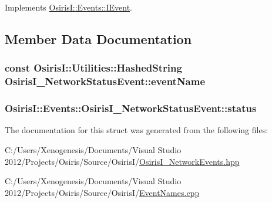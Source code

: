 Implements \hyperlink{struct_osiris_i_1_1_events_1_1_i_event_afb77e9812899e26563a5ee131c4c5d29}{Osiris\-I\-::\-Events\-::\-I\-Event}.



\subsection{Member Data Documentation}
\hypertarget{struct_osiris_i_1_1_events_1_1_osiris_i___network_status_event_a18ac0b938dfa57851e24080173a109fa}{
\subsubsection[{event\-Name}]{\setlength{\rightskip}{0pt plus 5cm}const {\bf Osiris\-I\-::\-Utilities\-::\-Hashed\-String} Osiris\-I\-\_\-\-Network\-Status\-Event\-::event\-Name\hspace{0.3cm}{\ttfamily [static]}}}\label{struct_osiris_i_1_1_events_1_1_osiris_i___network_status_event_a18ac0b938dfa57851e24080173a109fa}
\hypertarget{struct_osiris_i_1_1_events_1_1_osiris_i___network_status_event_a37129c546f0b1f7771ee633b05934860}{
\subsubsection[{status}]{ Osiris\-I\-::\-Events\-::\-Osiris\-I\-\_\-\-Network\-Status\-Event\-::status\hspace{0.3cm}{\ttfamily [protected]}}}\label{struct_osiris_i_1_1_events_1_1_osiris_i___network_status_event_a37129c546f0b1f7771ee633b05934860}


The documentation for this struct was generated from the following files\-:\begin{DoxyCompactItemize}
\item 
C\-:/\-Users/\-Xenogenesis/\-Documents/\-Visual Studio 2012/\-Projects/\-Osiris/\-Source/\-Osiris\-I/\hyperlink{_osiris_i___network_events_8hpp}{Osiris\-I\-\_\-\-Network\-Events.\-hpp}\item 
C\-:/\-Users/\-Xenogenesis/\-Documents/\-Visual Studio 2012/\-Projects/\-Osiris/\-Source/\-Osiris\-I/\hyperlink{_event_names_8cpp}{Event\-Names.\-cpp}\end{DoxyCompactItemize}
